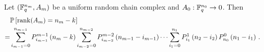 


\begin{theorem}\label{thmProbranks}
Let $(\mathbb{F}_q^{n_m}, A_m)$ be a uniform random chain complex 
and $A_0:\mathbb{F}_q^{n_0}\to 0$.  Then
\begin{align*}
 &  \mathbb{P}\left[\operatorname{\mathrm{rank}}(A_{m}) = n_{m} - k\right]\\
=& 	\sum_{i_{m-1}=0}^{n_{m-1}} P_{i_{m-1}}^{m-1}\left(n_{m} -k\right)
	\sum_{i_{m-2}=0}^{n_{m-2}} P_{i_{m-2}}^{m-2}\left(n_{m-1} - i_{m-1}\right)
		\cdots
        \sum_{i_1 = 0}^{n_1} P_{i_1}^1\left(n_2 - i_2\right) P_{n_0}^0 \left(n_1 - i_1\right) \, .
\end{align*}
\end{theorem}
